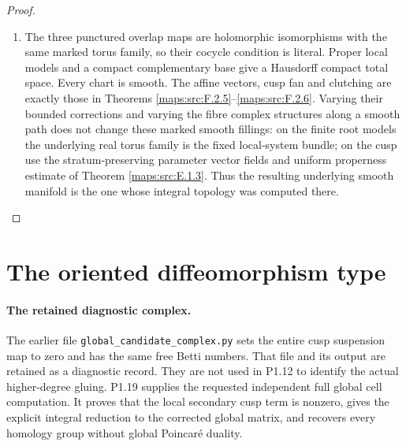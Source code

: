 \documentclass[11pt,a4paper]{article}
\theoremstyle{definition}
\begin{document}
\begin{proof}
\begin{enumerate}[label=\arabic*.]
The proof of Theorem \ref{maps:src:E.1.2} used only boundedness of $C$,
integrality of the standard cusp, and unimodularity of that
fan.  It therefore proves smoothness, proper discontinuity
and properness for this model without a symmetry condition
on $C$.  Glue by the displayed integral marking and use no
additional cusp translation.

\item The three punctured overlap maps are holomorphic isomorphisms
with the same marked torus family, so their cocycle condition
is literal.  Proper local models and a compact complementary
base give a Hausdorff compact total space.  Every chart is
smooth.  The affine vectors, cusp fan and clutching are exactly
those in Theorems \ref{maps:src:F.2.5}--\ref{maps:src:F.2.6}.  Varying their bounded corrections
and varying the fibre complex structures along a smooth path
does not change these marked smooth fillings: on the finite
root models the underlying real torus family is the fixed
local-system bundle; on the cusp use the stratum-preserving
parameter vector fields and uniform properness estimate of
Theorem \ref{maps:src:E.1.3}.  Thus the resulting underlying smooth manifold
is the one whose integral topology was computed there.

\end{enumerate}
\end{proof}


\section{The oriented diffeomorphism type}

\paragraph{The retained diagnostic complex.}
The earlier file \texttt{global\_candidate\_complex.py} sets the entire
cusp suspension map to zero and has the same free Betti numbers.
That file and its output are retained as a diagnostic record.  They
are not used in P1.12 to identify the actual higher-degree gluing.
P1.19 supplies the requested independent full global cell computation.
It proves that the local secondary cusp term is nonzero, gives the
explicit integral reduction to the corrected global matrix, and
recovers every homology group without global Poincar\'e duality.
\end{document}
